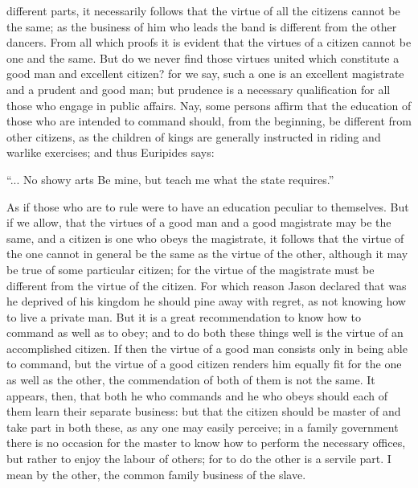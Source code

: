different parts, it necessarily follows that the virtue of all the
citizens cannot be the same; as the business of him who leads the band is
different from the other dancers. From all which proofs it is evident that
the virtues of a citizen cannot be one and the same. But do we never find
those virtues united which constitute a good man and excellent citizen?
for we say, such a one is an excellent magistrate and a prudent and good
man; but prudence is a necessary qualification for all those who engage in
public affairs. Nay, some persons affirm that the education of those who
are intended to command should, from the beginning, be different from
other citizens, as the children of kings are generally instructed in
riding and warlike exercises; and thus Euripides says:

``... No showy arts Be mine, but teach me what the state requires.''

As if those who are to rule were to have an education peculiar to
themselves. But if we allow, that the virtues of a good man and a good
magistrate may be the same, and a citizen is one who obeys the magistrate,
it follows that the virtue of the one cannot in general be the same as the
virtue of the other, although it may be true of some particular citizen;
for the virtue of the magistrate must be different from the virtue of the
citizen. For which reason Jason declared that was he deprived of his
kingdom he should pine away with regret, as not knowing how to live a
private man. But it is a great recommendation to know how to command as
well as to obey; and to do both these things well is the virtue of an
accomplished citizen. If then the virtue of a good man consists only in
being able to command, but the virtue of a good citizen renders him
equally fit for the one as well as the other, the commendation of both of
them is not the same. It appears, then, that both he who commands and he
who obeys should each of them learn their separate business: but that the
citizen should be master of and take part in both these, as any one may
easily perceive; in a family government there is no occasion for the
master to know how to perform the necessary offices, but rather to enjoy
the labour of others; for to do the other is a servile part. I mean by the
other, the common family business of the slave.

